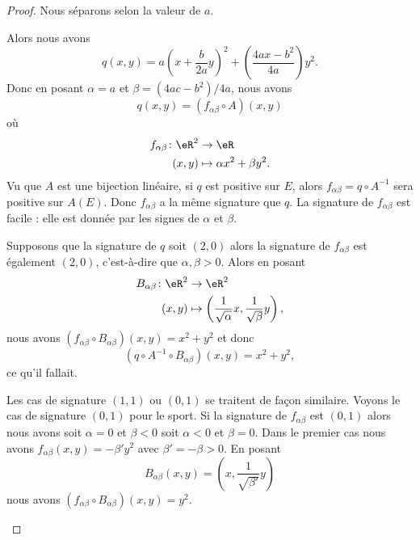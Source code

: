 \begin{proof}
	Nous séparons selon la valeur de \( a\).
	\begin{subproof}
		\spitem[Si \( a\neq 0\)]
		Alors nous avons
		\begin{equation}
			q(x,y)=a\left( x+\frac{ b }{ 2a }y \right)^2+\left( \frac{ 4ax-b^2 }{ 4a } \right)y^2.
		\end{equation}
		Donc en posant \( \alpha=a\) et \( \beta=(4ac-b^2)/4a\), nous avons
		\begin{equation}
			q(x,y)=(f_{\alpha\beta}\circ A)(x,y)
		\end{equation}
		où
		\begin{equation}
			\begin{aligned}
				f_{\alpha\beta}\colon \eR^2 & \to \eR                       \\
				(x,y)                       & \mapsto \alpha x^2+\beta y^2.
			\end{aligned}
		\end{equation}
		Vu que \( A\) est une bijection linéaire, si \( q\) est positive sur \( E\), alors \(f_{\alpha\beta}=q\circ A^{-1} \) sera positive sur \( A(E)\). Donc \( f_{\alpha\beta}\) a la même signature que \( q\). La signature de \( f_{\alpha\beta}\) est facile : elle est donnée par les signes de \( \alpha\) et \( \beta\).

		Supposons que la signature de \( q\) soit \( (2,0)\) alors la signature de \( f_{\alpha\beta}\) est également \( (2,0)\), c'est-à-dire que \( \alpha,\beta>0\). Alors en posant
		\begin{equation}
			\begin{aligned}
				B_{\alpha\beta}\colon \eR^2 & \to \eR^2                                                                    \\
				(x,y)                       & \mapsto \left( \frac{1}{ \sqrt{\alpha}}x,\frac{1}{ \sqrt{ \beta }}y \right),
			\end{aligned}
		\end{equation}
		nous avons \( (f_{\alpha\beta}\circ B_{\alpha\beta})(x,y)=x^2+y^2\) et donc
		\begin{equation}
			(q\circ A^{-1}\circ B_{\alpha\beta})(x,y)=x^2+y^2,
		\end{equation}
		ce qu'il fallait.

		Les cas de signature \( (1,1)\) ou \( (0,1)\) se traitent de façon similaire. Voyons le cas de signature \( (0,1)\) pour le sport. Si la signature de \( f_{\alpha\beta}\) est \( (0,1)\) alors nous avons soit \( \alpha=0\) et \( \beta<0\) soit \( \alpha<0\) et \( \beta=0\). Dans le premier cas nous avons \( f_{\alpha\beta}(x,y)=-\beta'y^2\) avec \( \beta'=-\beta>0\). En posant
		\begin{equation}
			B_{\alpha\beta}(x,y)=\left( x,\frac{1}{ \sqrt{ \beta' }}y \right)
		\end{equation}
		nous avons \( (f_{\alpha\beta}\circ B_{\alpha\beta})(x,y)=y^2\).


\end{subproof}
\end{proof}
